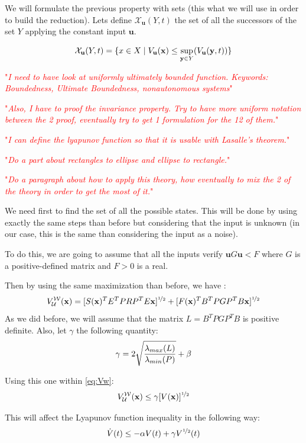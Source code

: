 \documentclass{article}
\theoremstyle{named}
\newcommand{\vect}[1]{\ensuremath{ \mathbf{#1}}}
\newcommand\comment[1]{\textcolor{red}{"\textit{#1}"}}
\begin{document}
We will formulate the previous property with sets (this what we will use in order to build the reduction).
Lets define $\mathcal{X}_{\vect{u}}(Y,t)$ the set of all the successors of the set $Y$ applying the constant input $\vect{u}$.

$$\mathcal{X}_{\vect{u}}(Y,t) = \{x \in X \mid \Vu(\vect{x}) \leq \sup_{\vect{y} \in Y}(\Vu(\vect{y},t)) \}$$

\comment{I need to have look at uniformly ultimately bounded function. Keywords: Boundedness, Ultimate Boundedness, nonautonomous systems}

\comment{Also, I have to proof the invariance property. Try to have more uniform notation between the 2 proof, eventually try to get 1 formulation for the 12 of them.}

\comment{I can define the lyapunov function so that it is usable with Lasalle's theorem.}

\comment{Do a part about rectangles to ellipse and ellipse to rectangle.}

\comment{Do a paragraph about how to apply this theory, how eventually to mix the 2 of the theory in order to get the most of it.}

We need first to find the set of all the possible states.
This will be done by using exactly the same steps than before but considering that the input is unknown (in our case, this is the same than considering the input as a noise).

To do this, we are going to assume that all the inputs verify $\vect{u} G \vect{u} < F$ where $G$ is a positive-defined matrix and $F>0$ is a real.

Then by using the same maximization than before, we have :
\newcommand{\Vw}{V_{\mathcal{U}}^{\mathcal{W}}}
\newcommand{\Vsup}{\overline{V}}
\begin{equation}\label{eq:Vw}
\Vw(\vect{x}) =
[S (\vect{x})^T E^T P R P^T E \vect{x} ]^{\nicefrac{1}{2}}+
[F (\vect{x})^T B^T P G P^T B \vect{x} ]^{\nicefrac{1}{2}}
\end{equation}
As we did before, we will assume that the matrix $L = B^T P G P^T B$ is positive definite.
Also, let $\gamma$ the following quantity:
$$\gamma = 2 \sqrt{\frac{\lambda_{max}(L)}{\lambda_{min}(P)}} + \beta$$

Using this one within \ref{eq:Vw}:
$$\Vw(\vect{x}) \leq \gamma [V(\vect{x})]^{\nicefrac{1}{2}}$$

This will affect the Lyapunov function inequality in the following way:
$$\dot{V}(t) \leq -\alpha V(t) + \gamma V^{\nicefrac{1}{2}}(t)$$
\end{document}
